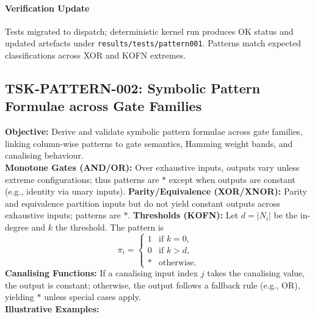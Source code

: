 \documentclass[11pt]{article}
\begin{document}
\paragraph{Verification Update} Tests migrated to dispatch; deterministic kernel run produces OK status and updated artefacts under \texttt{results/tests/pattern001}. Patterns match expected classifications across XOR and KOFN extremes.

\subsection{TSK-PATTERN-002: Symbolic Pattern Formulae across Gate Families}
\textbf{Objective:} Derive and validate symbolic pattern formulae across gate families, linking column-wise patterns to gate semantics, Hamming weight bands, and canalising behaviour.\\
\textbf{Monotone Gates (AND/OR):} Over exhaustive inputs, outputs vary unless extreme configurations; thus patterns are \(*\) except when outputs are constant (e.g., identity via unary inputs).
\textbf{Parity/Equivalence (XOR/XNOR):} Parity and equivalence partition inputs but do not yield constant outputs across exhaustive inputs; patterns are \(*\).
\textbf{Thresholds (KOFN):} Let \(d=\lvert N_i\rvert\) be the in-degree and \(k\) the threshold. The pattern is
\[
\pi_i=\begin{cases}
1 & \text{if } k=0,\\
0 & \text{if } k>d,\\
* & \text{otherwise.}
\end{cases}
\]
\textbf{Canalising Functions:} If a canalising input index \(j\) takes the canalising value, the output is constant; otherwise, the output follows a fallback rule (e.g., OR), yielding \(*\) unless special cases apply.\\
\textbf{Illustrative Examples:}
\end{document}

